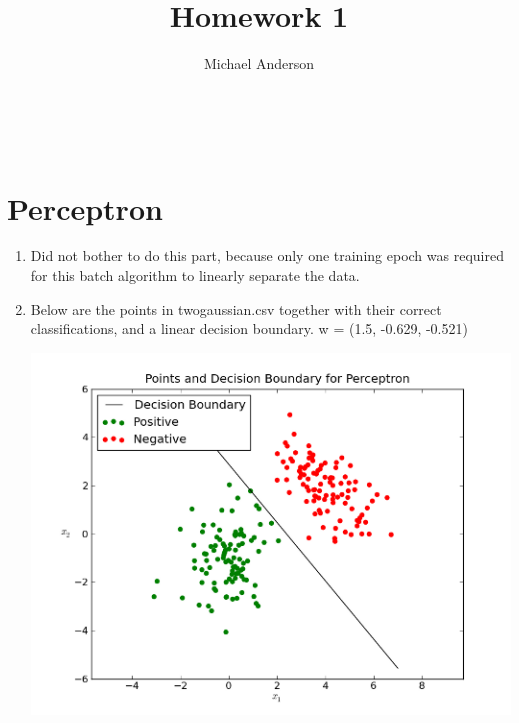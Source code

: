 \documentclass{article}
\author{Michael Anderson}
\title{Homework 1}
\begin{document}
\maketitle
{}
\\
\flushleft
\newpage

\section{Perceptron}

\begin{enumerate}
\item
Did not bother to do this part, because only one training epoch was required
for this batch algorithm to linearly separate the data.

\item
Below are the points in twogaussian.csv together with their correct
classifications, and a linear decision boundary. w = (1.5, -0.629, -0.521)

\includegraphics{perceptron.png}

\end{enumerate}

\newpage
\end{document}
